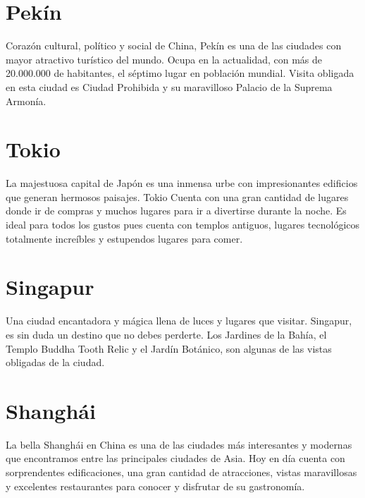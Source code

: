 \documentclass[letterpaper, 11 pt,oneside]{book}
\begin{document}
	 	\section{Pekín}
	 	Corazón cultural, político y social de China, Pekín es una de las ciudades con mayor atractivo turístico del mundo. Ocupa en la actualidad, con más de 20.000.000 de habitantes, el séptimo lugar en población mundial. Visita obligada en esta ciudad es Ciudad Prohibida y su maravilloso Palacio de la Suprema Armonía.
		\section{Tokio}	
 		La majestuosa capital de Japón es una inmensa urbe con impresionantes edificios que generan hermosos paisajes. Tokio Cuenta con una gran cantidad de lugares donde ir de compras y muchos lugares para ir a divertirse durante la noche. Es ideal para todos los gustos pues cuenta con templos antiguos, lugares tecnológicos totalmente increíbles y estupendos lugares para comer.
 		\section{Singapur}
 		Una ciudad encantadora y mágica llena de luces y lugares que visitar. Singapur, es sin duda un destino que no debes perderte. Los Jardines de la Bahía, el Templo Buddha Tooth Relic y el Jardín Botánico, son algunas de las vistas obligadas de la ciudad.
 		\section{Shanghái}
 		La bella Shanghái en China es una de las ciudades más interesantes y modernas que encontramos entre las principales ciudades de Asia. Hoy en día cuenta con sorprendentes edificaciones, una gran cantidad de atracciones, vistas maravillosas y excelentes restaurantes para conocer y disfrutar de su gastronomía.
\end{document}
